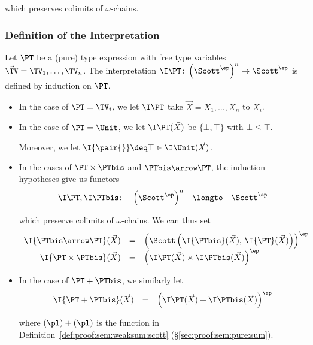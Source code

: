 \noindent
which preserves colimits of $\omega$-chains.


\subsubsection{Definition of the Interpretation}
\label{sec:proof:sem:pure:intdef}

Let $\PT$ be a (pure) type expression with free
type variables $\vec \TV = \TV_1,\dots,\TV_n$.
The interpretation $\I\PT \colon \left(\Scott^\ep\right)^n \to \Scott^\ep$
is defined by induction on $\PT$.
\begin{itemize}
\item
In the case of $\PT = \TV_i$,
we let $\I\PT$ take $\vec X = X_1,\dots,X_n$ to $X_i$.

\item
In the case of $\PT = \Unit$,
we let $\I\PT(\vec X)$ be $\{\bot, \top\}$ with $\bot \leq \top$.

Moreover,
we let $\I{\pair{}} \deq \top \in \I\Unit(\vec X)$.


\item
In the cases of $\PT \times \PTbis$
and $\PTbis \arrow \PT$,
the induction hypotheses give us
functors
\[
\begin{array}{*{4}{l}}
  \I\PT, \I\PTbis
  \colon
& \left( \Scott^\ep \right)^{n}
& \longto
& \Scott^\ep
\end{array}
\]

\noindent
which preserve colimits of $\omega$-chains.
We can thus set
\[
\begin{array}{r c l}
  \I{\PTbis \arrow \PT}(\vec X)
& =
& \left( \Scott \left( \I{\PTbis}(\vec X) ,\, \I{\PT}(\vec X) \right) \right)^\ep
\\
%
  \I{\PT \times \PTbis}(\vec X)
& =
& \left(
  \I\PT(\vec X) \times \I\PTbis(\vec X)
  \right)^\ep
\end{array}
\]

\item
In the case of $\PT + \PTbis$,
we similarly let 
\[
\begin{array}{r c l}
  \I{\PT + \PTbis}(\vec X)
& =
& \left(
  \I\PT(\vec X) + \I\PTbis(\vec X)
  \right)^\ep
\end{array}
\]

\noindent
where $(\pl) + (\pl)$ is the function in Definition~\ref{def:proof:sem:weaksum:scott}
(\S\ref{sec:proof:sem:pure:sum}).


\end{itemize}
